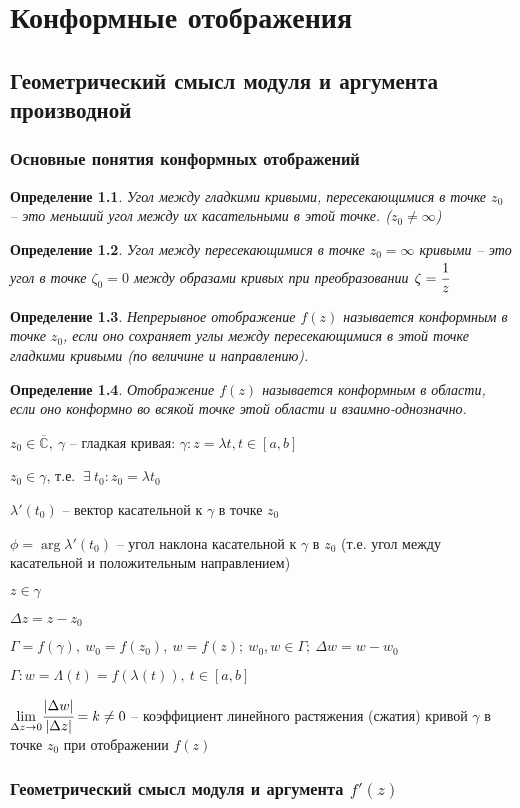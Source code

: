 \documentclass[final]{report}
\renewcommand{\C}{\mathbb{C}}
\newcommand{\mlim}[1]{\underset{#1}{\lim}}
\renewcommand{\bar}{\overline}
\newcommand{\g}{\gamma}
\renewcommand{\f}{\phi}
\renewcommand{\l}{\lambda}
\newcommand{\D}{\Delta}
\newcommand{\E}{\ \exists}
\newcommand{\CC}{\bar{\C}}
\newcommand{\opr}[1]{\begin{opred}#1\end{opred}}
\newtheorem*{opred}{Определение}
\theoremstyle{remark}
\begin{document}
\chapter{Конформные отображения}

\section{Геометрический смысл модуля и аргумента производной}

\subsection{Основные понятия конформных отображений}

\opr{Угол между гладкими кривыми, пересекающимися в точке $z_0$ -- это меньший угол между их касательными в этой точке. ($z_0\neq\infty$)}

\opr{Угол между пересекающимися в точке $z_0=\infty$ кривыми -- это угол в точке $\zeta_0=0$ между образами кривых при преобразовании $\zeta=\cfrac1z$}

\opr{Непрерывное отображение $f(z)$ называется конформным в точке $z_0$, если оно сохраняет углы между пересекающимися в этой точке гладкими кривыми (по величине и направлению).}

\opr{Отображение $f(z)$ называется конформным в области, если оно конформно во всякой точке этой области и взаимно-однозначно.}

$z_0\in\CC,\ \gamma$ -- гладкая кривая: $\gamma\colon z=\lambda{t},t\in[a,b]$

$z_0\in\gamma$, т.е. $\E\ t_0\colon z_0=\lambda{t_0}$

$\lambda'(t_0)$ -- вектор касательной к $\gamma$ в точке $z_0$

$\f=\arg \l'(t_0)$ -- угол наклона касательной к $\g$ в $z_0$ (т.е. угол между касательной и положительным направлением)

$z\in\g$

$\D z=z-z_0$

$\Gamma=f(\gamma),\ w_0=f(z_0),\ w=f(z);\ w_0,w\in\Gamma;\ \D w=w-w_0$

$\Gamma\colon w=\Lambda(t)=f(\l(t)),\ t\in[a,b]$

$\mlim{\D z\to0}\cfrac{|\D w|}{|\D z|}=k\neq0$ -- коэффициент линейного растяжения (сжатия) кривой $\g$ в точке $z_0$ при отображении $f(z)$

\subsection{Геометрический смысл модуля и аргумента $f'(z)$}
\end{document}
